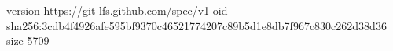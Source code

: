 version https://git-lfs.github.com/spec/v1
oid sha256:3cdb4f4926afe595bf9370c46521774207c89b5d1e8db7f967c830c262d38d36
size 5709
